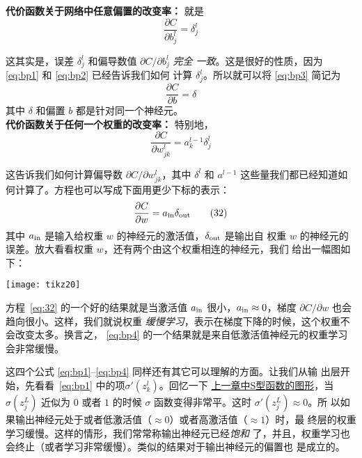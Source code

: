 \textbf{代价函数关于网络中任意偏置的改变率：} 就是
\begin{equation}
  \frac{\partial C}{\partial b^l_j} = \delta^l_j
  \label{eq:bp3}\tag{BP3}
\end{equation}

这其实是，误差 $\delta^l_j$ 和偏导数值 $\partial C / \partial b^l_j$ \emph{完全
  一致}。这是很好的性质，因为 \eqref{eq:bp1} 和 \eqref{eq:bp2} 已经告诉我们如何
计算 $\delta^l_j$。所以就可以将 \eqref{eq:bp3} 简记为
\begin{equation}
  \frac{\partial C}{\partial b} = \delta
  \label{eq:31}\tag{31}
\end{equation}
其中 $\delta$ 和偏置 $b$ 都是针对同一个神经元。\\

\textbf{代价函数关于任何一个权重的改变率：} 特别地，
\begin{equation}
  \frac{\partial C}{\partial w^l_{jk}} = a^{l-1}_k \delta^l_j
  \label{eq:bp4}\tag{BP4}
\end{equation}

这告诉我们如何计算偏导数 $\partial C/\partial w_{jk}^l$，其中 $\delta^l$ 和
$a^{l-1}$ 这些量我们都已经知道如何计算了。方程也可以写成下面用更少下标的表示：
\begin{equation}
  \frac{\partial
    C}{\partial w} = a_{\rm in} \delta_{\rm out}
  \label{eq:32}\tag{32}
\end{equation}
其中 $a_{\rm in}$ 是输入给权重 $w$ 的神经元的激活值，$\delta_{\rm out}$ 是输出自
权重 $w$ 的神经元的误差。放大看看权重 $w$，还有两个由这个权重相连的神经元，我们
给出一幅图如下：

\begin{center}
  \texttt{[image: tikz20]}
\end{center}

方程~\eqref{eq:32} 的一个好的结果就是当激活值 $a_{\rm in}$ 很小，$a_{\rm in}
\approx 0$，梯度 $\partial C/\partial w$ 也会趋向很小。这样，我们就说权重%
\emph{缓慢学习}，表示在梯度下降的时候，这个权重不会改变太多。换言之，
\eqref{eq:bp4} 的一个结果就是来自低激活值神经元的权重学习会非常缓慢。

这四个公式 \eqref{eq:bp1}--\eqref{eq:bp4} 同样还有其它可以理解的方面。让我们从输
出层开始，先看看~\eqref{eq:bp1} 中的项$\sigma'(z_k^l)$。回忆一下%
\hyperref[fig:StepFunction]{上一章中S型函数的图形}，当 $\sigma(z^L_j)$ 近似为
$0$ 或者 $1$ 的时候 $\sigma$ 函数变得非常平。这时 $\sigma'(z^L_j) \approx 0$。所
以如果输出神经元处于或者低激活值（$\approx 0$）或者高激活值（$\approx 1$）时，最
终层的权重学习缓慢。这样的情形，我们常常称输出神经元已经\emph{饱和}%
了，并且，权重学习也会终止（或者学习非常缓慢）。类似的结果对于输出神经元的偏置也
是成立的。

